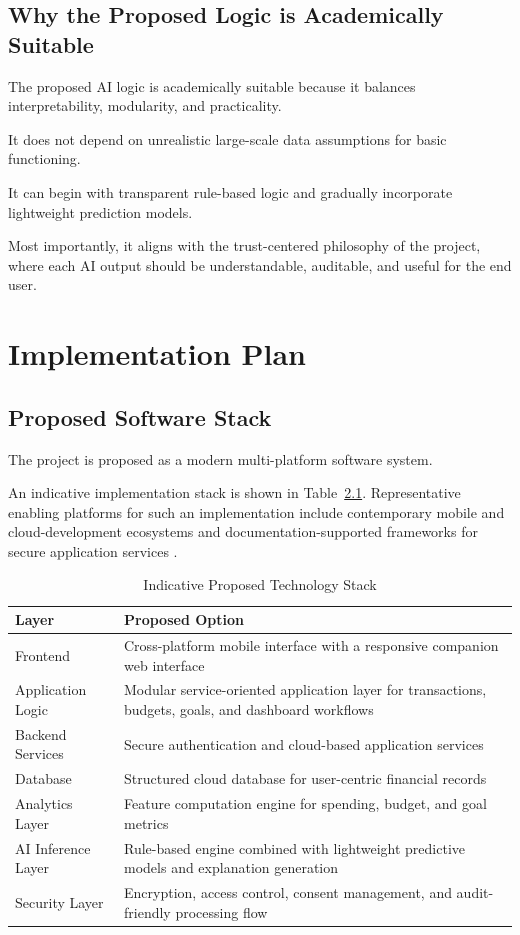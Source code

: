 \documentclass[12pt,a4paper]{report}
\begin{document}
\section{Why the Proposed Logic is Academically Suitable}
The proposed AI logic is academically suitable because it balances interpretability,
modularity,
and practicality.

It does not depend on unrealistic large-scale data assumptions for basic functioning.

It can begin with transparent rule-based logic and gradually incorporate lightweight prediction models.

Most importantly,
it aligns with the trust-centered philosophy of the project,
where each AI output should be understandable,
auditable,
and useful for the end user.

\chapter{Implementation Plan}

\section{Proposed Software Stack}
The project is proposed as a modern multi-platform software system.

An indicative implementation stack is shown in Table~\ref{tab:stack}. Representative enabling platforms for such an implementation include contemporary mobile and cloud-development ecosystems and documentation-supported frameworks for secure application services \cite{ref13,ref14,ref15,ref16}.

\begin{table}[H]
\centering
\caption{Indicative Proposed Technology Stack}
\label{tab:stack}
\begin{tabular}{p{4.5cm}p{8.8cm}}
\toprule
\textbf{Layer} & \textbf{Proposed Option} \\
\midrule
Frontend & Cross-platform mobile interface with a responsive companion web interface \\
Application Logic & Modular service-oriented application layer for transactions,
budgets,
goals,
and dashboard workflows \\
Backend Services & Secure authentication and cloud-based application services \\
Database & Structured cloud database for user-centric financial records \\
Analytics Layer & Feature computation engine for spending,
budget,
and goal metrics \\
AI Inference Layer & Rule-based engine combined with lightweight predictive models and explanation generation \\
Security Layer & Encryption,
access control,
consent management,
and audit-friendly processing flow \\
\bottomrule
\end{tabular}
\end{table}
\end{document}
